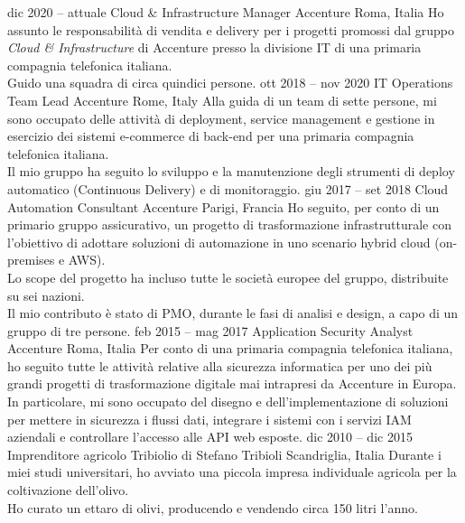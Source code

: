 \documentclass[9pt]{developercv}
\begin{document}
\begin{entrylist}
	\entry
		{dic 2020 -- attuale}
		{Cloud \& Infrastructure Manager}
		{Accenture}
		{Roma, Italia}
		{
			Ho assunto le responsabilità di vendita e delivery per i progetti promossi dal gruppo \textit{Cloud \& Infrastructure} di Accenture presso la divisione IT di una primaria compagnia telefonica italiana.
			\\
			Guido una squadra di circa quindici persone.
		}
	\entry
		{ott 2018 -- nov 2020}
		{IT Operations Team Lead}
		{Accenture}
		{Rome, Italy}
		{
			Alla guida di un team di sette persone, mi sono occupato delle attività di deployment, service management e gestione in esercizio dei sistemi e-commerce di back-end per una primaria compagnia telefonica italiana.
			\\
			Il mio gruppo ha seguito lo sviluppo e la manutenzione degli strumenti di deploy automatico (Continuous Delivery) e di monitoraggio.
		}
	\entry
		{giu 2017 -- set 2018}
		{Cloud Automation Consultant}
		{Accenture}
		{Parigi, Francia}
		{
			Ho seguito, per conto di un primario gruppo assicurativo, un progetto di trasformazione infrastrutturale con l'obiettivo di adottare soluzioni di automazione in uno scenario hybrid cloud (on-premises e AWS).
			\\
			Lo scope del progetto ha incluso tutte le società europee del gruppo, distribuite su sei nazioni.
			\\
			Il mio contributo è stato di PMO, durante le fasi di analisi e design, a capo di un gruppo di tre persone.
		}
	\entry
		{feb 2015 -- mag 2017}
		{Application Security Analyst}
		{Accenture}
		{Roma, Italia}
		{
			Per conto di una primaria compagnia telefonica italiana, ho seguito tutte le attività relative alla sicurezza informatica per uno dei più grandi progetti di trasformazione digitale mai intrapresi da Accenture in Europa.
			\\
			In particolare, mi sono occupato del disegno e dell'implementazione di soluzioni per mettere in sicurezza i flussi dati, integrare i sistemi con i servizi IAM aziendali e controllare l'accesso alle API web esposte.
		}
	\entry
		{dic 2010 -- dic 2015}
		{Imprenditore agricolo}
		{Tribiolio di Stefano Tribioli}
		{Scandriglia, Italia}
		{
			Durante i miei studi universitari, ho avviato una piccola impresa individuale agricola per la coltivazione dell'olivo.
			\\
			Ho curato un ettaro di olivi, producendo e vendendo circa 150 litri l'anno.
		}
\end{entrylist}
\end{document}
